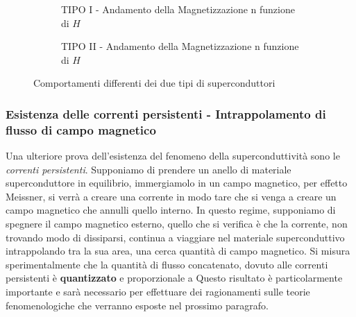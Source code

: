 \begin{figure}
\begin{subfigure}[b]{0.4\textwidth}
{
	}
	\caption{TIPO I - Andamento della Magnetizzazione n funzione di $H$}
	\end{subfigure}
	\qquad\quad
        \begin{subfigure}[b]{0.4\textwidth}
	\caption{TIPO II - Andamento della Magnetizzazione n funzione di $H$}
	\end{subfigure}
	\caption{Comportamenti differenti dei due tipi di superconduttori}
	\label{SUPER:TIPI2}
\end{figure}

\subsubsection{Esistenza delle correnti persistenti - Intrappolamento di flusso di campo magnetico}
Una ulteriore prova dell'esistenza del fenomeno della superconduttivit\`a sono le \textit{correnti persistenti}. Supponiamo di prendere un anello di materiale superconduttore in equilibrio, immergiamolo in un campo magnetico, per effetto Meissner, si verr\`a a creare una corrente in modo tare che si venga a creare un campo magnetico che annulli quello interno. In questo regime, supponiamo di spegnere il campo magnetico esterno, quello che si verifica \`e che la corrente, non trovando modo di dissiparsi, continua a viaggiare nel materiale superconduttivo intrappolando tra la sua area, una cerca quantit\`a di campo magnetico. Si misura sperimentalmente che la quantit\`a di flusso concatenato, dovuto alle correnti persistenti \`e \textbf{quantizzato} e proporzionale a
Questo risultato \`e particolarmente importante e sar\`a necessario per effettuare dei ragionamenti sulle teorie fenomenologiche che verranno esposte nel prossimo paragrafo.
